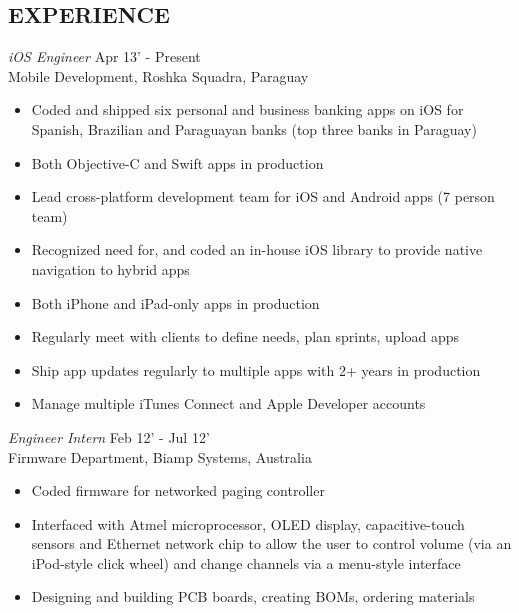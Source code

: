 \documentclass[margin]{res}
\begin{document}
\begin{resume}

\section{EXPERIENCE} {\sl iOS Engineer} \hfill Apr 13' - Present \\
                Mobile Development, Roshka Squadra, Paraguay  
                 \begin{itemize}  \itemsep -2pt %
                 \item Coded and shipped six personal and business banking apps on iOS for Spanish, Brazilian and Paraguayan banks (top three banks in Paraguay)
                 \item Both Objective-C and Swift apps in production
                 \item Lead cross-platform development team for iOS and Android apps (7 person team)
                 \item Recognized need for, and coded an in-house iOS library to provide native navigation to hybrid apps
         	\item Both iPhone and iPad-only apps in production
		\item Regularly meet with clients to define needs, plan sprints, upload apps
		\item Ship app updates regularly to multiple apps with 2+ years in production
                 \item Manage multiple iTunes Connect and Apple Developer accounts
                \end{itemize}
 
                {\sl Engineer Intern} \hfill            Feb 12' - Jul 12' \\
                Firmware Department, Biamp Systems, Australia 
                 \begin{itemize}  \itemsep -2pt %
                 \item Coded firmware for networked paging controller
                 \item Interfaced with Atmel microprocessor,
                  OLED display, capacitive-touch sensors and Ethernet network chip to allow the user to 
                  control volume (via an iPod-style click wheel) and change channels via a menu-style interface 
                  \item Designing and building PCB boards, creating BOMs, ordering materials
                 \end{itemize} 
                   

\end{resume}
\end{document}
